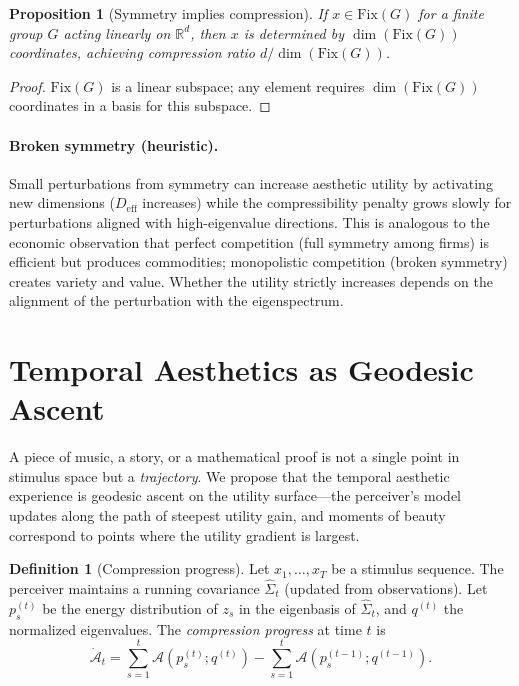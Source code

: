 \documentclass[journal]{IEEEtran}
\newtheorem{proposition}[theorem]{Proposition}
\theoremstyle{definition}
\newtheorem{definition}[theorem]{Definition}
\theoremstyle{remark}
\newcommand{\R}{\mathbb{R}}
\begin{document}
\begin{proposition}[Symmetry implies compression]
\label{prop:symmetry}
If $x \in \mathrm{Fix}(G)$ for a finite group $G$ acting linearly
on $\R^d$, then $x$ is determined by $\dim(\mathrm{Fix}(G))$
coordinates, achieving compression ratio
$d / \dim(\mathrm{Fix}(G))$.
\end{proposition}

\begin{proof}
$\mathrm{Fix}(G)$ is a linear subspace; any element requires
$\dim(\mathrm{Fix}(G))$ coordinates in a basis for this subspace.
\end{proof}

\paragraph{Broken symmetry (heuristic).}
Small perturbations from symmetry can increase aesthetic utility
by activating new dimensions ($D_{\mathrm{eff}}$ increases) while
the compressibility penalty grows slowly for perturbations aligned
with high-eigenvalue directions.  This is analogous to the economic
observation that perfect competition (full symmetry among firms)
is efficient but produces commodities; monopolistic
competition (broken symmetry) creates variety and value.  Whether
the utility strictly increases depends on the alignment of the
perturbation with the eigenspectrum.


\section{Temporal Aesthetics as Geodesic Ascent}
\label{sec:temporal}

A piece of music, a story, or a mathematical proof is not a single
point in stimulus space but a \emph{trajectory}.  We propose that
the temporal aesthetic experience is geodesic ascent on the utility
surface---the perceiver's model updates along the path of steepest
utility gain, and moments of beauty correspond to points where the
utility gradient is largest.

\begin{definition}[Compression progress]
Let $x_1, \ldots, x_T$ be a stimulus sequence.  The perceiver
maintains a running covariance $\hat{\Sigma}_t$ (updated from
observations).  Let $p_s^{(t)}$ be the energy distribution of
$z_s$ in the eigenbasis of $\hat{\Sigma}_t$, and $q^{(t)}$ the
normalized eigenvalues.  The \emph{compression progress} at time
$t$ is
\begin{equation}
    \dot{\mathcal{A}}_t = \sum_{s=1}^t
    \mathcal{A}(p_s^{(t)}; q^{(t)}) -
    \sum_{s=1}^t \mathcal{A}(p_s^{(t-1)}; q^{(t-1)}).
\end{equation}
\end{definition}
\end{document}
